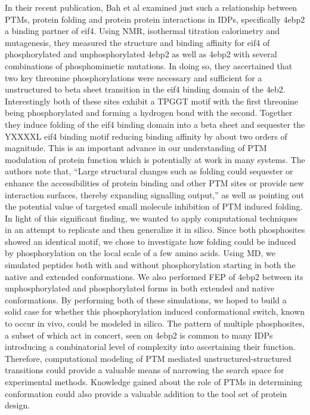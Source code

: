 In their recent publication, Bah et al examined just such a relationship between PTMs, protein folding and protein protein interactions in IDPs, specifically 4ebp2 a binding partner of eif4. \cite{bah-idp2015}
Using NMR, isothermal titration calorimetry and mutagenesis, they measured the structure and binding affinity for eif4 of phosphorylated and unphosphorylated 4ebp2 as well as 4ebp2 with several combinations of phosphomimetic mutations.
In doing so, they ascertained that two key threonine phosphorylations were necessary and sufficient for a unstructured to beta sheet transition in the eif4 binding domain of the 4eb2.
Interestingly both of these sites exhibit a TPGGT motif with the first threonine being phosphorylated and forming a hydrogen bond with the second.
Together they induce folding of the eif4 binding domain into a beta sheet and sequester the YXXXXL eif4 binding motif reducing binding affinity by about two orders of magnitude.
This is an important advance in our understanding of PTM modulation of protein function which is potentially at work in many systems.
The authors note that, “Large structural changes such as folding could sequester or enhance the accessibilities of protein binding and other PTM sites or provide new interaction surfaces, thereby expanding signalling output,” as well as pointing out the potential value of targeted small molecule inhibition of PTM induced folding.  In light of this significant finding, we wanted to apply computational techniques in an attempt to replicate and then generalize it in silico. Since both phosphosites showed an identical motif, we chose to investigate how folding could be induced by phosphorylation on the local scale of a few amino acids.   Using MD, we simulated peptides both with and without phosphorylation starting in both the native and extended conformations.  We also performed FEP of 4ebp2 between its unphosphorylated and phosphorylated forms in both extended and native conformations.  By performing both of these simulations, we hoped to build a solid case for whether this phosphorylation induced conformational switch, known to occur in vivo, could be modeled in silico.  The pattern of multiple phosphosites, a subset of which act in concert, seen on 4ebp2 is common to many IDPs introducing a combinatorial level of complexity into ascertaining their function. Therefore, computational modeling of PTM mediated unstructured-structured transitions could provide a valuable means of narrowing the search space for experimental methods.  Knowledge gained about the role of PTMs in determining conformation could also provide a valuable addition to the tool set of protein design.

